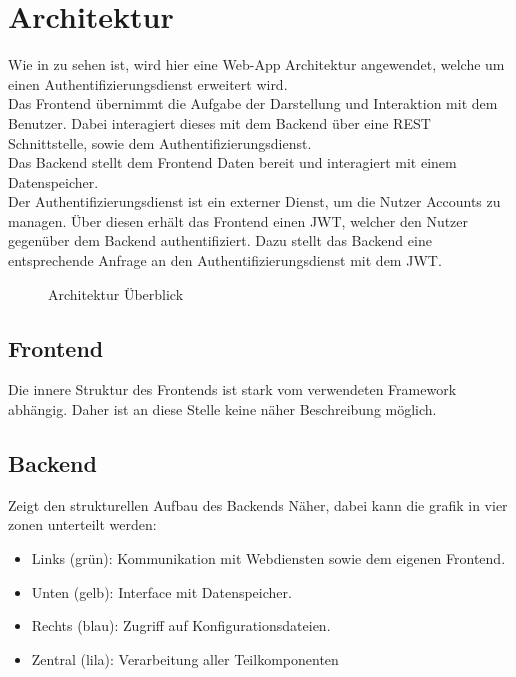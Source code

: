 \chapter{Architektur}\label{ch:architektur}
Wie in  zu sehen ist, wird hier eine Web-App Architektur angewendet,
welche um einen Authentifizierungsdienst erweitert wird.\\
Das Frontend übernimmt die Aufgabe der Darstellung und Interaktion mit dem Benutzer.
Dabei interagiert dieses mit dem Backend über eine \ac{REST} Schnittstelle, sowie dem Authentifizierungsdienst.\\
Das Backend stellt dem Frontend Daten bereit und interagiert mit einem Datenspeicher.\\
Der Authentifizierungsdienst ist ein externer Dienst, um die Nutzer Accounts zu managen.
Über diesen erhält das Frontend einen \ac{JWT}, welcher den Nutzer gegenüber dem Backend authentifiziert.
Dazu stellt das Backend eine entsprechende Anfrage an den Authentifizierungsdienst mit dem \ac{JWT}.

\begin{figure}[h]
    \centering
    
    \caption{Architektur Überblick}\label{fig:HighLevelArch}
\end{figure}

\section{Frontend}\label{sec:frontend}

Die innere Struktur des Frontends ist stark vom verwendeten Framework abhängig.
Daher ist an diese Stelle keine näher Beschreibung möglich.

\section{Backend}\label{sec:fokus:-backend}

 Zeigt den strukturellen Aufbau des Backends Näher, dabei kann die grafik in vier zonen unterteilt werden:
\begin{itemize}
    \item Links (grün): Kommunikation mit Webdiensten sowie dem eigenen Frontend.
    \item Unten (gelb): Interface mit Datenspeicher.
    \item Rechts (blau): Zugriff auf Konfigurationsdateien.
    \item Zentral (lila): Verarbeitung aller Teilkomponenten
\end{itemize}

